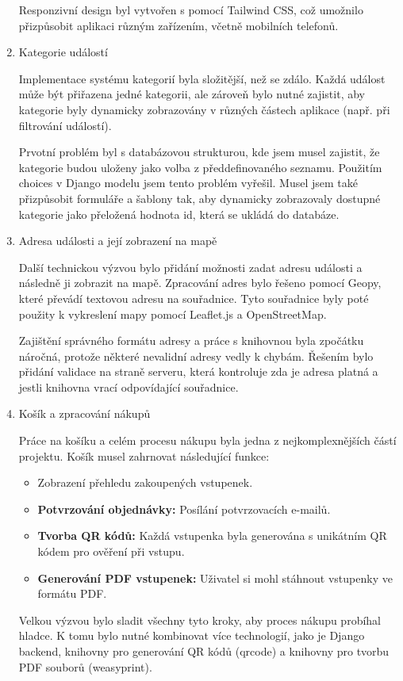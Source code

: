 \documentclass[12pt, a4paper,
twoside,        %
openright
]{report}
\begin{document}
\begin{enumerate}
	Responzivní design byl vytvořen s pomocí Tailwind CSS, což umožnilo přizpůsobit aplikaci různým zařízením, včetně mobilních telefonů.
	
	\item{Kategorie událostí}
	
	Implementace systému kategorií byla složitější, než se zdálo. Každá událost může být přiřazena jedné kategorii, ale zároveň bylo nutné zajistit, aby kategorie byly dynamicky zobrazovány v různých částech aplikace (např. při filtrování událostí).
	
	Prvotní problém byl s databázovou strukturou, kde jsem musel zajistit, že kategorie budou uloženy jako volba z předdefinovaného seznamu. Použitím choices v Django modelu jsem tento problém vyřešil. Musel jsem také přizpůsobit formuláře a šablony tak, aby dynamicky zobrazovaly dostupné kategorie jako přeložená hodnota id, která se ukládá do databáze.
	
	\item{Adresa události a její zobrazení na mapě}
	
	Další technickou výzvou bylo přidání možnosti zadat adresu události a následně ji zobrazit na mapě. Zpracování adres bylo řešeno pomocí Geopy, které převádí textovou adresu na souřadnice. Tyto souřadnice byly poté použity k vykreslení mapy pomocí Leaflet.js a OpenStreetMap.
	
	Zajištění správného formátu adresy a práce s knihovnou byla zpočátku náročná, protože některé nevalidní adresy vedly k chybám. Řešením bylo přidání validace na straně serveru, která kontroluje zda je adresa platná a jestli knihovna vrací odpovídající souřadnice.
	
	\item{Košík a zpracování nákupů}
	
	Práce na košíku a celém procesu nákupu byla jedna z nejkomplexnějších částí projektu. Košík musel zahrnovat následující funkce:
	
	\begin{itemize}
		\item Zobrazení přehledu zakoupených vstupenek.
		\item \textbf{Potvrzování objednávky:} Posílání potvrzovacích e-mailů.
		\item \textbf{Tvorba QR kódů:} Každá vstupenka byla generována s unikátním QR kódem pro ověření při vstupu.
		\item \textbf{Generování PDF vstupenek:} Uživatel si mohl stáhnout vstupenky ve formátu PDF.
	\end{itemize}
	
	Velkou výzvou bylo sladit všechny tyto kroky, aby proces nákupu probíhal hladce. K tomu bylo nutné kombinovat více technologií, jako je Django backend, knihovny pro generování QR kódů (qrcode) a knihovny pro tvorbu PDF souborů (weasyprint).
\end{enumerate}
\end{document}
